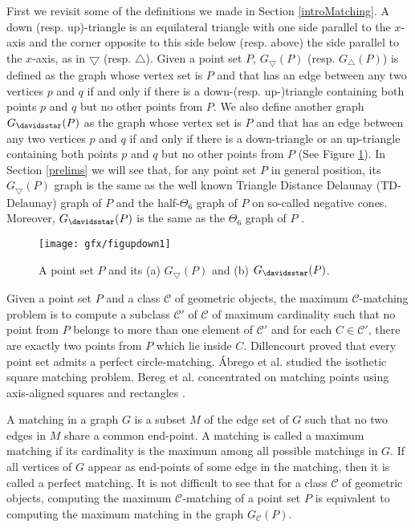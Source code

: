 First we revisit some of the definitions we made in Section \ref{introMatching}.
A down (resp. up)-triangle is an equilateral triangle with one side parallel to the $x$-axis and the corner opposite to this side below
(resp. above) the side parallel to the $x$-axis, as in $\bigtriangledown$ (resp. $\bigtriangleup$).
Given a point set $P$, $G_{\bigtriangledown}(P)$ (resp. $G_{\bigtriangleup}(P)$) is defined as the graph whose vertex set is $P$ and that has an edge 
between any two vertices $p$ and $q$ if and only if there is a down-(resp. up-)triangle containing both points $p$ and $q$ but no other points from 
$P$. We also define another graph $G_{\davidsstar}(P)$ as the graph whose vertex set is $P$ and that has an edge between any two vertices $p$ and $q$ if 
and only if there is a down-triangle or an up-triangle containing both points $p$ and $q$ but no other points from $P$ (See Figure \ref{graph}). 
In Section \ref{prelims} we will see that, for any point set $P$ in general position, its $G_{\bigtriangledown}(P)$ graph is the same as the well known 
Triangle Distance Delaunay (TD-Delaunay) graph of $P$ and the half-$\Theta_6$ graph of $P$ on so-called negative cones. Moreover, $G_{\davidsstar}(P)$ is the 
same as the $\Theta_6$ graph of $P$ \cite{Bonichon2010,Chew1989}. 
\begin{figure}
\centering
  \texttt{[image: gfx/figupdown1]}   %
  \caption{A point set $P$ and its (a) $G_{\bigtriangledown}(P)$ and (b) $G_{\davidsstar}(P)$.}
\label{graph}
  \end{figure}

Given a point set $P$ and a class $\mathcal{C}$ of geometric objects, the maximum $\mathcal{C}$-matching problem is to compute a subclass $\mathcal{C}'$ 
of $\mathcal{C}$ of maximum cardinality such that no point from $P$ belongs to more than one element of $\mathcal{C}'$ and for each 
$C \in \mathcal{C}'$, there are exactly two points from $P$ which lie inside $C$. Dillencourt \cite{Dillencourt1990} proved that every point set 
admits a perfect circle-matching. \'{A}brego et al. \cite{Abrego2009} studied the isothetic square matching  problem. Bereg et al. concentrated on 
matching points using axis-aligned squares and rectangles \cite{Bereg2009}.

A matching in a graph $G$ is a subset $M$ of the edge set of $G$ such that no two edges in $M$ share a common end-point. A matching is called a 
maximum matching if its cardinality is the maximum among all possible matchings in $G$. If all vertices of $G$ appear as end-points of some edge 
in the matching, then it is called a perfect matching. It is not difficult to see that for a class $\mathcal{C}$ of geometric objects, computing 
the maximum $\mathcal{C}$-matching of a point set $P$ is equivalent to computing the maximum matching in the graph $G_\mathcal{C}(P)$.

